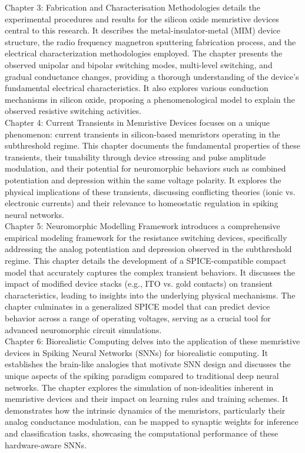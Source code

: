\noindent Chapter 3: Fabrication and Characterisation Methodologies details the experimental procedures and results for the silicon oxide memristive devices central to this research. It describes the metal-insulator-metal (MIM) device structure, the radio frequency magnetron sputtering fabrication process, and the electrical characterization methodologies employed. The chapter presents the observed unipolar and bipolar switching modes, multi-level switching, and gradual conductance changes, providing a thorough understanding of the device's fundamental electrical characteristics. It also explores various conduction mechanisms in silicon oxide, proposing a phenomenological model to explain the observed resistive switching activities.\\

\noindent Chapter 4: Current Transients in Memristive Devices focuses on a unique phenomenon: current transients in silicon-based memristors operating in the subthreshold regime. This chapter documents the fundamental properties of these transients, their tunability through device stressing and pulse amplitude modulation, and their potential for neuromorphic behaviors such as combined potentiation and depression within the same voltage polarity. It explores the physical implications of these transients, discussing conflicting theories (ionic vs. electronic currents) and their relevance to homeostatic regulation in spiking neural networks.\\

\noindent Chapter 5: Neuromorphic Modelling Framework introduces a comprehensive empirical modeling framework for the resistance switching devices, specifically addressing the analog potentiation and depression observed in the subthreshold regime. This chapter details the development of a SPICE-compatible compact model that accurately captures the complex transient behaviors. It discusses the impact of modified device stacks (e.g., ITO vs. gold contacts) on transient characteristics, leading to insights into the underlying physical mechanisms. The chapter culminates in a generalized SPICE model that can predict device behavior across a range of operating voltages, serving as a crucial tool for advanced neuromorphic circuit simulations.\\

\noindent Chapter 6: Biorealistic Computing delves into the application of these memristive devices in Spiking Neural Networks (SNNs) for biorealistic computing. It establishes the brain-like analogies that motivate SNN design and discusses the unique aspects of the spiking paradigm compared to traditional deep neural networks. The chapter explores the simulation of non-idealities inherent in memristive devices and their impact on learning rules and training schemes. It demonstrates how the intrinsic dynamics of the memristors, particularly their analog conductance modulation, can be mapped to synaptic weights for inference and classification tasks, showcasing the computational performance of these hardware-aware SNNs.\\

